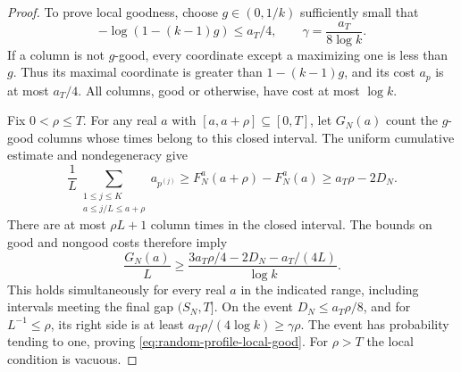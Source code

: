 \begin{proof}
To prove local goodness, choose $g\in(0,1/k)$ sufficiently small
that
\[
 -\log(1-(k-1)g)\le a_T/4,
 \qquad \gamma=\frac{a_T}{8\log k}.
\]
If a column is not $g$-good, every coordinate except a maximizing
one is less than $g$. Thus its maximal coordinate is greater than
$1-(k-1)g$, and its cost $a_p$ is at most $a_T/4$.
All columns, good or otherwise, have cost at most $\log k$.

Fix $0<\rho\le T$. For any real $a$ with
$[a,a+\rho]\subseteq[0,T]$, let $G_N(a)$ count the $g$-good
columns whose times belong to this closed interval. The uniform
cumulative estimate and nondegeneracy give
\[
 \frac1L\sum_{\substack{1\le j\le K\\a\le j/L\le a+\rho}}
         a_{p^{(j)}}
 \ge F_N^a(a+\rho)-F_N^a(a)
 \ge a_T\rho-2D_N.
\]
There are at most $\rho L+1$ column times in the closed interval.
The bounds on good and nongood costs therefore imply
\[
 \frac{G_N(a)}L
 \ge\frac{3a_T\rho/4-2D_N-a_T/(4L)}{\log k}.
\]
This holds simultaneously for every real $a$ in the indicated range,
including intervals meeting the final gap $(S_N,T]$. On the event
$D_N\le a_T\rho/8$, and for $L^{-1}\le\rho$, its right side is
at least $a_T\rho/(4\log k)\ge\gamma\rho$.
The event has probability tending to one, proving
\eqref{eq:random-profile-local-good}. For $\rho>T$ the local
condition is vacuous.
\end{proof}
